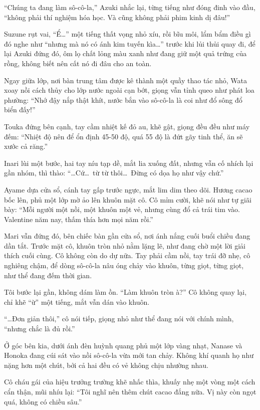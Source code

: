 \documentclass[../main.tex]{subfiles}
\begin{document}
``Chúng ta đang làm sô-cô-la,'' Azuki nhắc lại, từng tiếng như đóng đinh vào đầu, ``không phải thí nghiệm hóa học. Và cũng không phải phim kinh dị đâu!''

Suzune rụt vai, ``Ể\dots'' một tiếng thất vọng nhỏ xíu, rồi bĩu môi, lẩm bẩm điều gì đó nghe như ``nhưng mà nó có ánh kim tuyến kìa\dots'' trước khi lủi thủi quay đi, để lại Azuki đứng đó, ôm lọ chất lỏng màu xanh như đang giữ một quả trứng của rồng, không biết nên cất nó đi đâu cho an toàn.

Ngay giữa lớp, nơi bàn trung tâm được kê thành một quầy thao tác nhỏ, Wata xoay nồi cách thủy cho lớp nước ngoài cạn bớt, giọng vẫn tỉnh queo như phát loa phường: ``Nhớ đậy nắp thật khít, nước bắn vào sô-cô-la là coi như đổ sông đổ biển đấy!''

Touka đứng bên cạnh, tay cầm nhiệt kế đỏ au, khẽ gật, giọng đều đều như máy đếm: ``Nhiệt độ nên để ổn định 45-50 độ, quá 55 độ là đứt gãy tinh thể, ăn sẽ xước cả răng.''

Inari lùi một bước, hai tay níu tạp dề, mắt lia xuống đất, nhưng vẫn cố nhích lại gần nhóm, thì thào:
``\dots Cứ\dots\ từ từ thôi\dots\ Đừng có dọa họ như vậy chứ.''

Ayame dựa cửa sổ, cánh tay gấp trước ngực, mắt lim dim theo dõi. Hương cacao bốc lên, phủ một lớp mờ ảo lên khuôn mặt cô. Cô mỉm cười, khẽ nói như tự giãi bày: ``Mỗi người một nồi, một khuôn một vẻ, nhưng cùng đổ cả trái tim vào. Valentine năm nay, thấm thía hơn mọi năm rồi.''

Mari vẫn đứng đó, bên chiếc bàn gần cửa sổ, nơi ánh nắng cuối buổi chiều đang dần tắt. Trước mặt cô, khuôn tròn nhỏ nằm lặng lẽ, như đang chờ một lời giải thích cuối cùng. Cô không còn do dự nữa. Tay phải cầm nồi, tay trái đỡ nhẹ, cô nghiêng chậm, để dòng sô-cô-la nâu óng chảy vào khuôn, từng giọt, từng giọt, như thể đang đếm thời gian.

Tôi bước lại gần, không dám làm ồn. ``Làm khuôn tròn à?'' Cô không quay lại, chỉ khẽ ``ừ'' một tiếng, mắt vẫn dán vào khuôn.

``\dots Đơn giản thôi,'' cô nói tiếp, giọng nhỏ như thể đang nói với chính mình, ``nhưng chắc là đủ rồi.''

Ở góc bên kia, dưới ánh đèn huỳnh quang phủ một lớp vàng nhạt, Nanase và Honoka đang cúi sát vào nồi sô-cô-la vừa mới tan chảy. Không khí quanh họ như nặng hơn một chút, bởi cả hai đều có vẻ không chịu nhường nhau.

Cô cháu gái của hiệu trưởng trường khẽ nhấc thìa, khuấy nhẹ một vòng một cách cẩn thận, mũi nhíu lại: ``Tôi nghĩ nên thêm chút cacao đắng nữa. Vị này còn ngọt quá, không có chiều sâu.''
\end{document}
